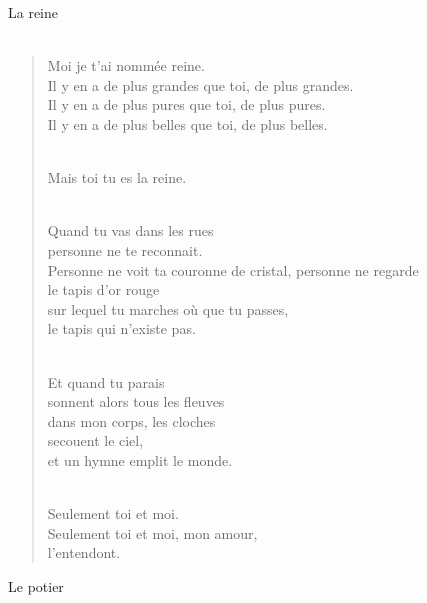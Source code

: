 \documentclass[11pt,a4paper]{book}
\begin{document}
\newpage

{\huge La reine} \\ \\

\begin{verse}
Moi je t'ai nommée reine. \\
Il y en a de plus grandes que toi, de plus grandes. \\
Il y en a de plus pures que toi, de plus pures. \\
Il y en a de plus belles que toi, de plus belles. \\ \

Mais toi tu es la reine. \\ \

Quand tu vas dans les rues \\
personne ne te reconnait. \\
Personne ne voit ta couronne de cristal, personne ne regarde \\
le tapis d'or rouge \\
sur lequel tu marches où que tu passes, \\
le tapis qui n'existe pas. \\ \

Et quand tu parais \\
sonnent alors tous les fleuves \\
dans mon corps, les cloches \\
secouent le ciel, \\
et un hymne emplit le monde. \\ \

Seulement toi et moi. \\
Seulement toi et moi, mon amour, \\
l'entendont. \\
\end{verse}

\newpage

{\huge Le potier} \\ \\
\end{document}
